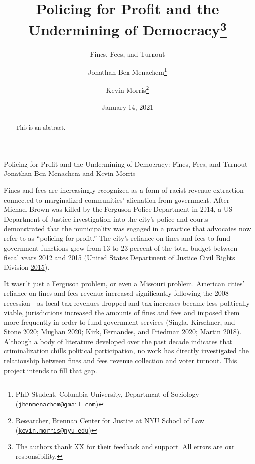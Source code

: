 \documentclass[
  12pt,
]{article}
\title{Policing for Profit and the Undermining of Democracy\thanks{The authors thank XX for their feedback and support. All errors are our responsibility.}}
\subtitle{Fines, Fees, and Turnout}
\author{Jonathan Ben-Menachem\footnote{PhD Student, Columbia University, Department of Sociology (\href{mailto:jbenmenachem@gmail.com}{\nolinkurl{jbenmenachem@gmail.com}})} \and Kevin Morris\footnote{Researcher, Brennan Center for Justice at NYU School of Law (\href{mailto:kevin.morris@nyu.edu}{\nolinkurl{kevin.morris@nyu.edu}})}}
\date{January 14, 2021}
\begin{document}
\maketitle
\begin{abstract}
This is an abstract.
\end{abstract}

\pagebreak

\begin{center}
Policing for Profit and the Undermining of Democracy: Fines, Fees, and Turnout \\
Jonathan Ben-Menachem and Kevin Morris
\end{center}

Fines and fees are increasingly recognized as a form of racist revenue extraction connected to marginalized communities' alienation from government. After Michael Brown was killed by the Ferguson Police Department in 2014, a US Department of Justice investigation into the city's police and courts demonstrated that the municipality was engaged in a practice that advocates now refer to as ``policing for profit.'' The city's reliance on fines and fees to fund government functions grew from 13 to 23 percent of the total budget between fiscal years 2012 and 2015 (United States Department of Justice Civil Rights Division \protect\hyperlink{ref-UnitedStatesDepartmentofJusticeCivilRightsDivision2015}{2015}).

It wasn't just a Ferguson problem, or even a Missouri problem. American cities' reliance on fines and fees revenue increased significantly following the 2008 recession---as local tax revenues dropped and tax increases became less politically viable, jurisdictions increased the amounts of fines and fees and imposed them more frequently in order to fund government services (Singla, Kirschner, and Stone \protect\hyperlink{ref-Singla2020}{2020}; Mughan \protect\hyperlink{ref-Mughan2020}{2020}; Kirk, Fernandes, and Friedman \protect\hyperlink{ref-Kirk2020}{2020}; Martin \protect\hyperlink{ref-Martin2018}{2018}). Although a body of literature developed over the past decade indicates that criminalization chills political participation, no work has directly investigated the relationship between fines and fees revenue collection and voter turnout. This project intends to fill that gap.
\end{document}
